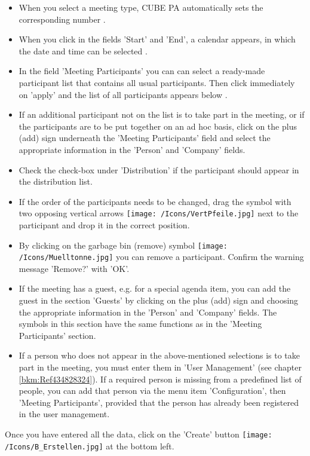 \begin{itemize}
\item 
When you select a meeting type, CUBE PA automatically sets the corresponding number .
\item 
When you click in the fields 'Start' and 'End', a calendar appears, in which the date and time can be selected .
\item 
In the field 'Meeting Participants' you can can select a ready-made participant list  that contains all usual participants. Then click immediately on 'apply'  and the list of all participants appears below .
\item 
If an additional participant not on the list is to take part in the meeting, or if the participants are to be put together on an ad hoc basis, click on the plus (add) sign  underneath the 'Meeting Participants' field and select the appropriate information in the 'Person' and 'Company' fields. 
\item
Check the check-box  under 'Distribution' if the participant should appear in the distribution list.
\item 
If the order of the participants needs to be changed, drag the symbol with two opposing vertical arrows \texttt{[image: /Icons/VertPfeile.jpg]}  next to the participant and drop it in the correct position.
\item 
By clicking on the garbage bin (remove) symbol \texttt{[image: /Icons/Muelltonne.jpg]}  you can remove a participant. Confirm the warning message 'Remove?' with 'OK'.
\item 
If the meeting has a guest, e.g. for a special agenda item, you can add the guest in the section 'Guests' by clicking on the plus (add) sign and choosing the appropriate information in the 'Person' and 'Company' fields. The symbols in this section have the same functions as in the 'Meeting Participants' section.
\item 
If a person who does not appear in the above-mentioned selections is to take part in the meeting, you must enter them in 'User Management' (see chapter \ref{bkm:Ref434828324}). If a required person is missing from a predefined list of people, you can add that person via the menu item 'Configuration', then 'Meeting Participants', provided that the person has already been registered in the user management.
\end{itemize}

Once you have entered all the data, click on the 'Create' button \texttt{[image: /Icons/B\_Erstellen.jpg]} at the bottom left.

